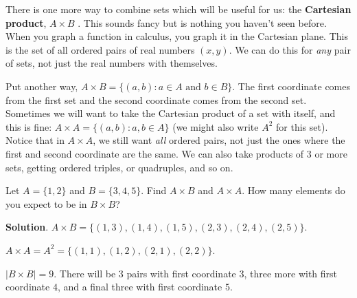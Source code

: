 \documentclass[11pt,]{book}
\newcommand{\terminology}[1]{\textbf{#1}}
\theoremstyle{ptxplainnotitle}
\theoremstyle{ptxplaintitle}
\theoremstyle{ptxdefinitionnotitle}
\theoremstyle{ptxdefinitiontitle}
\theoremstyle{ptxdefinitionnotitle}
\theoremstyle{ptxdefinitiontitle}
\theoremstyle{ptxdefinitionnotitle}
\theoremstyle{ptxdefinitiontitle}
\theoremstyle{ptxdefinitiontitlenonumber}
\theoremstyle{ptxdefinitiontitlenonumber}
\numberwithin{equation}{chapter}
\newcommand{\st}{:}
\begin{document}
\hypertarget{p-744}{}%
There is one more way to combine sets which will be useful for us: the \terminology{Cartesian product}, \(A \times B\)\label{notation-25}
. This sounds fancy but is nothing you haven't seen before. When you graph a function in calculus, you graph it in the Cartesian plane. This is the set of all ordered pairs of real numbers \((x,y)\). We can do this for \emph{any} pair of sets, not just the real numbers with themselves.%
\par
\hypertarget{p-745}{}%
Put another way, \(A \times B = \{(a,b) \st a \in A \text{ and } b \in B\}\). The first coordinate comes from the first set and the second coordinate comes from the second set. Sometimes we will want to take the Cartesian product of a set with itself, and this is fine: \(A \times A = \{(a,b) \st a, b \in A\}\) (we might also write \(A^2\) for this set). Notice that in \(A \times A\), we still want \emph{all} ordered pairs, not just the ones where the first and second coordinate are the same. We can also take products of 3 or more sets, getting ordered triples, or quadruples, and so on.%
\begin{example}\label{example-33}
\hypertarget{p-746}{}%
Let \(A = \{1,2\}\) and \(B = \{3,4,5\}\). Find \(A \times B\) and \(A \times A\). How many elements do you expect to be in \(B \times B\)?%
\par\smallskip%
\noindent\textbf{Solution}.\hypertarget{solution-99}{}\quad%
\hypertarget{p-747}{}%
\(A \times B = \{(1,3), (1,4), (1,5), (2,3), (2,4), (2,5)\}\).%
\par
\hypertarget{p-748}{}%
\(A \times A = A^2 = \{(1,1), (1,2), (2,1), (2,2)\}\).%
\par
\hypertarget{p-749}{}%
\(|B\times B| = 9\). There will be 3 pairs with first coordinate \(3\), three more with first coordinate \(4\), and a final three with first coordinate \(5\).%
\end{example}
\typeout{************************************************}
\typeout{************************************************}
\end{document}
